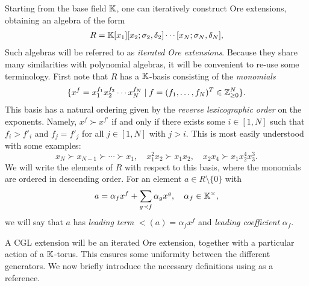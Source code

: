 Starting from the base field $\mathbb{K}$, one can iteratively construct Ore extensions,
obtaining an algebra of the form
\begin{align*}
	R = \mathbb{K}[x_1][x_2; \sigma_2, \delta_2]\cdots[x_N; \sigma_N, \delta_N],
\end{align*}
%
Such algebras will be referred to as \emph{iterated Ore extensions}. Because they share many similarities with polynomial algebras, it
will be convenient to re-use some terminology. First note that $R$ has a $\mathbb{K}$-basis
consisting of the \emph{monomials}
\begin{equation*}
	\{x^f = x_1^{f_1}x_2^{f_2}\cdots x_N^{f_N} \mid f = (f_1, \dots, f_N)^T \in \mathbb{Z}_{\geq 0}^N\}.
\end{equation*}
%
This basis has a natural ordering given by the \emph{reverse lexicographic
	order} on the exponents. Namely, $x^f \succ x^{f'}$
if and only if there exists some $i \in [1, N]$ such that $f_i > f'_i$ and $f_j = f'_j$
for all $j \in [1, N]$ with $j > i$. This is most easily understood with some examples:
\begin{equation*}
	x_N \succ x_{N-1} \succ \cdots \succ x_1, \quad x_1^2x_2 \succ x_1x_2, \quad x_2x_4 \succ x_1x_2^4 x_3^3.
\end{equation*}
%
We will write the elements of $R$ with respect to this basis, where the monomials are
ordered in descending order. For an element $a \in R \setminus \{0\}$ with
\begin{equation*}
	a = \alpha_f x^f + \sum_{g \prec f} \alpha_g x^g, \quad \alpha_f \in \mathbb{K}^\times,
\end{equation*}
%
we will say that $a$ has \emph{leading term} $\lt(a) = \alpha_f
	x^f$ and \emph{leading coefficient}
$\alpha_f$.

A CGL extension will be an iterated Ore extension, together with a particular action of
a $\mathbb{K}$-torus. This ensures some uniformity between the different generators. We now
briefly introduce the necessary definitions using \cite{GoodearlBrown2002LecturesAQC}
as a reference.

